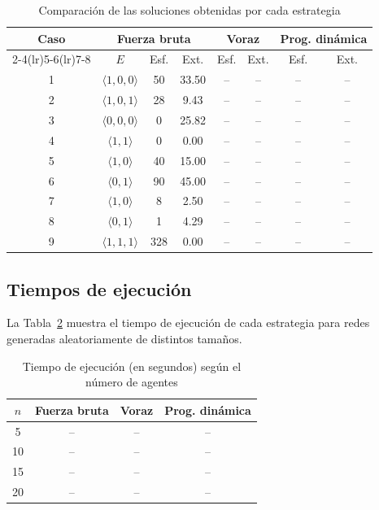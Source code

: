\documentclass[11pt,letterpaper]{article}
\begin{document}
\begin{table}[H]
  \centering
  \caption{Comparación de las soluciones obtenidas por cada estrategia}
  \label{tab:comparacion}
  \begin{tabular}{cccccccc}
    \toprule
    \multirow{2}{*}{Caso} & \multicolumn{3}{c}{Fuerza bruta} & \multicolumn{2}{c}{Voraz} & \multicolumn{2}{c}{Prog. dinámica} \\
    \cmidrule(lr){2-4}\cmidrule(lr){5-6}\cmidrule(lr){7-8}
     & $E$ & Esf. & Ext. & Esf. & Ext. & Esf. & Ext. \\
    \midrule
    1 & $\langle 1,0,0\rangle$ & 50  & 33.50 & -- & -- & -- & -- \\
    2 & $\langle 1,0,1\rangle$ & 28  & 9.43  & -- & -- & -- & -- \\
    3 & $\langle 0,0,0\rangle$ & 0   & 25.82 & -- & -- & -- & -- \\
    4 & $\langle 1,1\rangle$   & 0   & 0.00  & -- & -- & -- & -- \\
    5 & $\langle 1,0\rangle$   & 40  & 15.00 & -- & -- & -- & -- \\
    6 & $\langle 0,1\rangle$   & 90  & 45.00 & -- & -- & -- & -- \\
    7 & $\langle 1,0\rangle$   & 8   & 2.50  & -- & -- & -- & -- \\
    8 & $\langle 0,1\rangle$   & 1   & 4.29  & -- & -- & -- & -- \\
    9 & $\langle 1,1,1\rangle$ & 328 & 0.00  & -- & -- & -- & -- \\
    \bottomrule
  \end{tabular}
\end{table}

\subsection{Tiempos de ejecución}

La Tabla~\ref{tab:tiempos} muestra el tiempo de ejecución de cada estrategia
para redes generadas aleatoriamente de distintos tamaños.

\begin{table}[H]
  \centering
  \caption{Tiempo de ejecución (en segundos) según el número de agentes}
  \label{tab:tiempos}
  \begin{tabular}{cccc}
    \toprule
    $n$ & Fuerza bruta & Voraz & Prog. dinámica \\
    \midrule
    5   & -- & -- & -- \\
    10  & -- & -- & -- \\
    15  & -- & -- & -- \\
    20  & -- & -- & -- \\
    \bottomrule
  \end{tabular}
\end{table}
\end{document}

